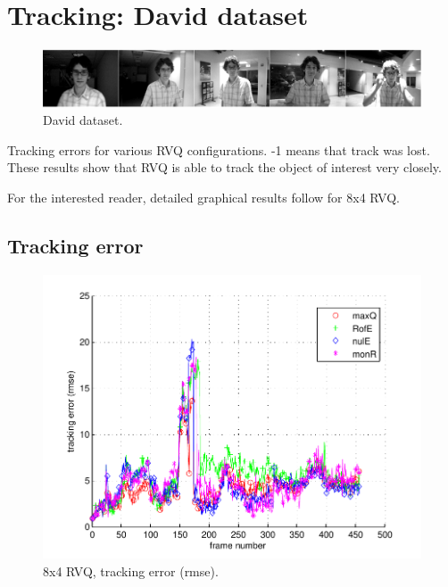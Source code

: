 \clearpage
\newpage
\section{Tracking: David dataset} 
								\begin{figure}[h!]
								\centering
								\includegraphics[width=1.0\textwidth]{thesis/seq_2_davidin300.png}
								\caption{David dataset.}
								\label{fig:seq_1_David}
								\end{figure}



\begin{table}[h]
\centering

\caption{Tracking errors for various RVQ configurations.  -1 means that track was lost.  These results show that RVQ is able to track the object of interest very closely.}
\end{table}

For the interested reader, detailed graphical results follow for 8x4 RVQ.

\clearpage
\newpage
\subsection{Tracking error}

								\begin{figure}[h!]
								\centering
								\includegraphics[height=0.38\textheight]{thesis/2_davidin300_8_4_1000_trk_rmse.pdf}
								\caption{8x4 RVQ, tracking error (rmse).}
								\label{fig:2_davidin300_8_4_1000_trk_rmse}
								\end{figure}


